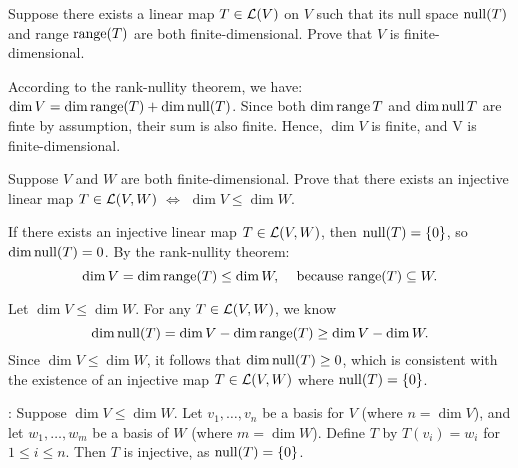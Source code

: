 \begin{xrcs}
  Suppose there exists a linear map $T \in \mathcal{L}(V)$ on $V$ such that its null space $\operatorname{null}(T)$ and range $\operatorname{range}(T)$ are both finite-dimensional. Prove that $V$ is finite-dimensional.

  \begin{xprf}
    According to the rank-nullity theorem, we have: $ \dim V = \dim \operatorname{range}(T) + \dim \operatorname{null}(T)$. Since both $\dim \operatorname{range} T$ and $\dim \operatorname{null} T$ are finte by assumption, their sum is also finite. Hence, $\dim V$ is finite, and V is finite-dimensional.
  \end{xprf}
\end{xrcs}

\begin{xrcs}
  Suppose $V$ and $W$ are both finite-dimensional. Prove that there exists an injective linear map $T \in \mathcal{L}(V,W)$ $\iff$ $\dim V \leq \dim W$.

  \begin{xprf}
    \Rightarrowdirection If there exists an injective linear map $T \in \mathcal{L}(V,W)$, then $\operatorname{null}(T) = \{0\}$, so $\dim \operatorname{null}(T) = 0$. By the rank-nullity theorem:
    \begin{equation}
      \dim V = \dim \myrange(T) \leq \dim W, \quad $ because $ \myrange(T) \subseteq W.
    \end{equation}

    \Leftarrowdirection Let $\dim V \leq \dim W$. For any $T \in \mathcal{L}(V,W)$, we know
    \begin{equation}
      \dim \operatorname{null}(T) = \dim V - \dim \operatorname{range}(T) \geq \dim V - \dim W.
    \end{equation}
    Since $\dim V \leq \dim W$, it follows that $\dim \operatorname{null}(T) \geq 0$, which is consistent with the existence of an injective map $T \in \mathcal{L}(V,W)$ where $\operatorname{null}(T) = \{0\}$.

    :
    Suppose $\dim V \leq \dim W$. Let $v_1, \dots, v_n$ be a basis for $V$ (where $n = \dim V$), and let $w_1, \dots, w_m$ be a basis of $W$ (where $m = \dim W$). Define $T$ by $T(v_i) = w_i$ for $1 \leq i \leq n$. Then $T$ is injective, as $\operatorname{null}(T) = \{0\}$.
  \end{xprf}
\end{xrcs}


